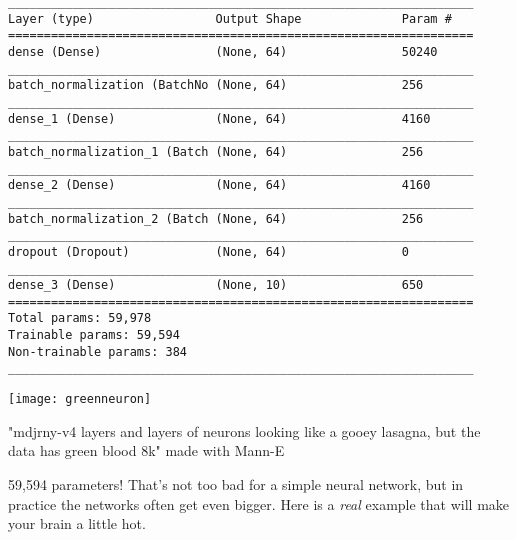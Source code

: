 \begin{lstlisting}[style=kaolstplain,linewidth=1.5\textwidth]
_________________________________________________________________
Layer (type)                 Output Shape              Param #   
=================================================================
dense (Dense)                (None, 64)                50240     
_________________________________________________________________
batch_normalization (BatchNo (None, 64)                256       
_________________________________________________________________
dense_1 (Dense)              (None, 64)                4160      
_________________________________________________________________
batch_normalization_1 (Batch (None, 64)                256       
_________________________________________________________________
dense_2 (Dense)              (None, 64)                4160      
_________________________________________________________________
batch_normalization_2 (Batch (None, 64)                256       
_________________________________________________________________
dropout (Dropout)            (None, 64)                0         
_________________________________________________________________
dense_3 (Dense)              (None, 10)                650       
=================================================================
Total params: 59,978
Trainable params: 59,594
Non-trainable params: 384
_________________________________________________________________
\end{lstlisting}

\begin{marginfigure}[-5.5cm]
        \texttt{[image: greenneuron]}
        \caption{"mdjrny-v4 layers and layers of neurons looking like a gooey lasagna, but the data has green blood 8k" made with Mann-E}
\end{marginfigure}

59,594 parameters! That's not too bad for a simple neural network, but in practice the networks often get even bigger. Here is a \textit{real} example that will make your brain a little hot.

